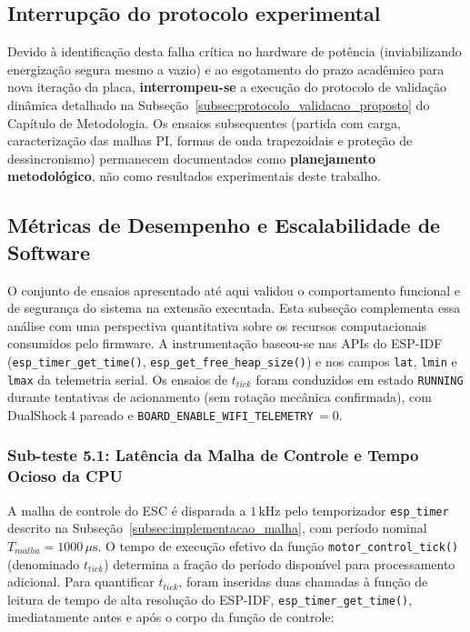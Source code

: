 \subsection{Interrupção do protocolo experimental}

Devido à identificação desta falha crítica no hardware de potência (inviabilizando energização segura mesmo a vazio) e ao esgotamento do prazo acadêmico para nova iteração da placa, \textbf{interrompeu-se} a execução do protocolo de validação dinâmica detalhado na Subseção~\ref{subsec:protocolo_validacao_proposto} do Capítulo de Metodologia. Os ensaios subsequentes (partida com carga, caracterização das malhas PI, formas de onda trapezoidais e proteção de dessincronismo) permanecem documentados como \textbf{planejamento metodológico}, não como resultados experimentais deste trabalho.

\subsection{Métricas de Desempenho e Escalabilidade de Software}
\label{subsec:metricas_desempenho_software}

O conjunto de ensaios apresentado até aqui validou o comportamento funcional e de segurança do sistema na extensão executada. Esta subseção complementa essa análise com uma perspectiva quantitativa sobre os recursos computacionais consumidos pelo firmware. A instrumentação baseou-se nas APIs do ESP-IDF (\texttt{esp\_timer\_get\_time()}, \texttt{esp\_get\_free\_heap\_size()}) e nos campos \texttt{lat}, \texttt{lmin} e \texttt{lmax} da telemetria serial. Os ensaios de $t_{tick}$ foram conduzidos em estado \texttt{RUNNING} durante tentativas de acionamento (sem rotação mecânica confirmada), com DualShock\,4 pareado e \texttt{BOARD\_ENABLE\_WIFI\_TELEMETRY}\,$= 0$.

\subsubsection{Sub-teste 5.1: Latência da Malha de Controle e Tempo Ocioso da CPU}

A malha de controle do ESC é disparada a $1\,\text{kHz}$ pelo temporizador \texttt{esp\_timer} descrito na Subseção~\ref{subsec:implementacao_malha}, com período nominal $T_{malha} = 1000\,\mu\text{s}$. O tempo de execução efetivo da função \texttt{motor\_control\_tick()} (denominado $t_{tick}$) determina a fração do período disponível para processamento adicional. Para quantificar $t_{tick}$, foram inseridas duas chamadas à função de leitura de tempo de alta resolução do ESP-IDF, \texttt{esp\_timer\_get\_time()}, imediatamente antes e após o corpo da função de controle:

